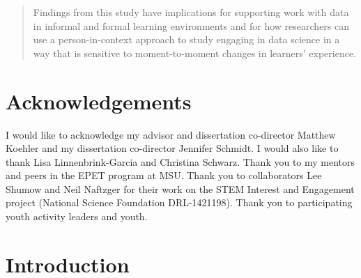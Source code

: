 \documentclass[]{msu-thesis}
\theoremstyle{definition}
\theoremstyle{definition}
\theoremstyle{definition}
\theoremstyle{remark}
\begin{document}
\begin{abstract}
Findings from this study have implications for supporting work with data in informal and formal learning environments and for how researchers can use a person-in-context approach to study engaging in data science in a way that is sensitive to moment-to-moment changes in learners' experience.

\end{abstract}

\clearpage

\makecopyrightpage

%
\makededicationpage
%
\clearpage

\chapter*{Acknowledgements}
\DoubleSpacing %
I would like to acknowledge my advisor and dissertation co-director Matthew Koehler and my dissertation co-director Jennifer Schmidt. I would also like to thank Lisa Linnenbrink-Garcia and Christina Schwarz. Thank you to my mentors and peers in the EPET program at MSU. Thank you to collaborators Lee Shumow and Neil Naftzger for their work on the STEM Interest and Engagement project (National Science Foundation DRL-1421198). Thank you to participating youth activity leaders and youth.
\clearpage

\SingleSpacing
\tableofcontents* %
\clearpage
\listoftables %
\clearpage
\listoffigures %
\mainmatter
%

\chapter{Introduction}\label{intro}

\DoubleSpacing
\end{document}
